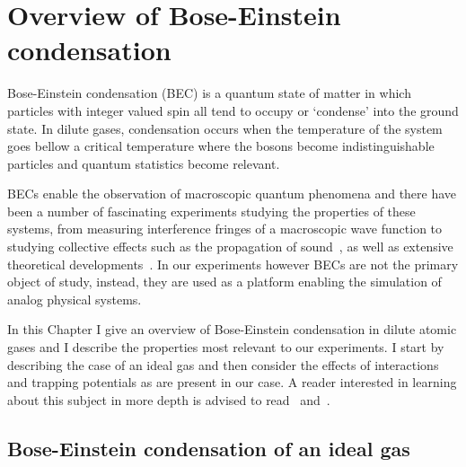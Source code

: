 
\renewcommand{\thechapter}{2}

\chapter{Overview of Bose-Einstein condensation}

Bose-Einstein condensation (BEC) is a quantum state of matter in which particles with integer valued spin all tend to occupy or `condense' into the ground state. In dilute gases, condensation occurs when the temperature of the system goes bellow a critical temperature where the bosons become indistinguishable particles and quantum statistics become relevant. 

BECs enable the observation of macroscopic quantum phenomena and there have been a number of fascinating experiments studying the properties of these systems, from measuring interference fringes of a macroscopic wave function to studying collective effects such as the propagation of sound~\cite{ketterle_w._making_1999}, as well as extensive theoretical developments~\cite{dalfovo_theory_1999}. In our experiments however BECs are not the primary object of study, instead, they are used as a platform enabling the simulation of analog physical systems. 

In this Chapter I give an overview of Bose-Einstein condensation in dilute atomic gases and I describe the properties most relevant to our experiments. I start by describing the case of an ideal gas and then consider the effects of interactions and trapping potentials as are present in our case. A reader interested in learning about this subject in more depth is advised to read~\cite{Pethick} and~\cite{noauthor_bose-einstein_2003}.

\section{Bose-Einstein condensation of an ideal gas}

